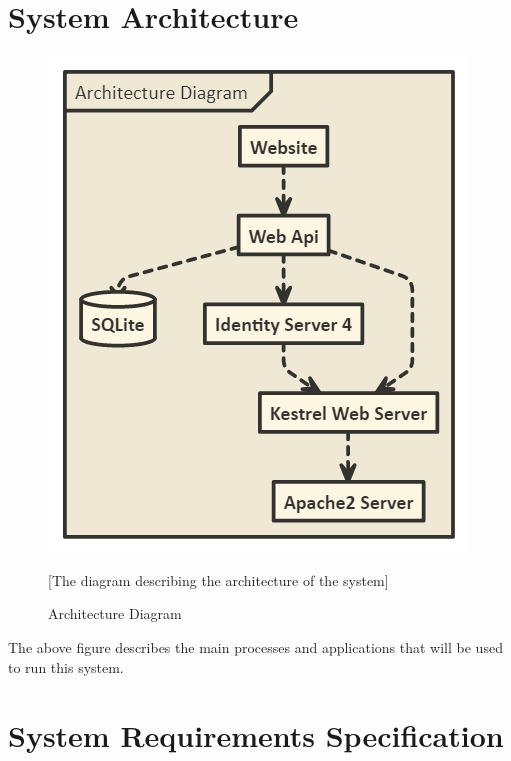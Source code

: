 \documentclass[letterpaper]{article}
\begin{document}
\section{System Architecture}
\begin{figure}[htbp]
  \includegraphics[scale = .5]{ArchitectureDiagram}
  \caption{Architecture Diagram}[The diagram describing the architecture of the system]
  \centering
\end{figure}
The above figure describes the main processes and applications that will be used to run this system.

\pagebreak

\section{System Requirements Specification}
\end{document}
